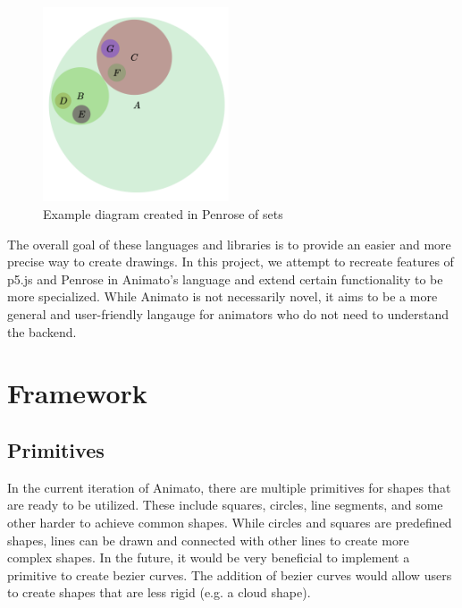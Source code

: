 \documentclass[acmsmall,screen]{acmart}
\begin{document}
\begin{center}
  \begin{figure}[!h]
    \includegraphics[width=0.49\textwidth]{images/penrose.png}
    \caption{Example diagram created in Penrose of sets}
  \end{figure}
\end{center}

\noindent The overall goal of these languages and libraries is to provide an easier and more precise way to create drawings.
In this project, we attempt to recreate features of p5.js and Penrose in Animato's language and extend certain functionality to be more specialized.
While Animato is not necessarily novel, it aims to be a more general and user-friendly langauge for animators who do not need to understand the backend.

\section{Framework}
\subsection{Primitives}
In the current iteration of Animato, there are multiple primitives for shapes that are ready to be utilized.
These include squares, circles, line segments, and some other harder to achieve common shapes. 
While circles and squares are predefined shapes, lines can be drawn and connected with other lines to create more complex shapes.
In the future, it would be very beneficial to implement a primitive to create bezier curves.
The addition of bezier curves would allow users to create shapes that are less rigid (e.g. a cloud shape).
\end{document}
